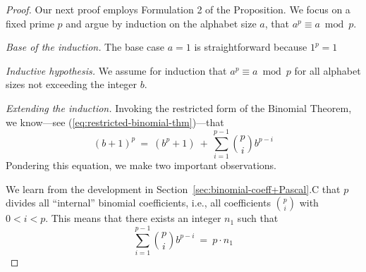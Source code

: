 \begin{proof}
Our next proof employs Formulation 2 of the Proposition.  We focus on
a fixed prime $p$ and argue by induction on the alphabet size $a$,
that $a^{p} \equiv a \bmod p$.

\noindent
{\it Base of the induction.}
The base case $a=1$ is straightforward because $1^{p} = 1$

\noindent
{\it Inductive hypothesis.}
We assume for induction that $a^{p} \equiv a \bmod p$ for all alphabet
sizes not exceeding the integer $b$.

\noindent
{\it Extending the induction.}
Invoking the restricted form of the Binomial Theorem,
we know---see (\ref{eq:restricted-binomial-thm})---that
\begin{equation}
\label{eq:FLT-0}
(b+1)^p \ = \ \left( b^p + 1 \right) \ + \
 \sum_{i=1}^{p-1} {p \choose i} b^{p-i}
\end{equation}
Pondering this equation, we make two important observations.

We learn from the development in
Section~\ref{sec:binomial-coeff+Pascal}.C that $p$ divides all
``internal'' binomial coefficients, i.e., all coefficients
$\displaystyle {p \choose i}$ with $0 < i < p$.  This means that there
exists an integer $n_1$ such that
\begin{equation}
\label{eq:FLT-1}
 \sum_{i=1}^{p-1} {p \choose i} b^{p-i} \ = \ p \cdot n_1
\end{equation}

\bigskip

\noindent {}

\bigskip


\end{proof}
